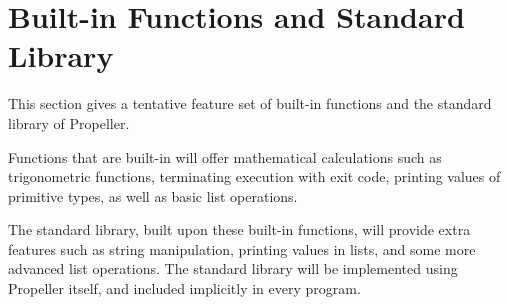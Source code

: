 \section{Built-in Functions and Standard Library}

This section gives a tentative feature set of built-in functions and the standard library of
Propeller.

Functions that are built-in will offer mathematical calculations such as trigonometric functions,
terminating execution with exit code, printing values of primitive types, as well as basic list
operations.

The standard library, built upon these built-in functions, will provide extra features such as
string manipulation, printing values in lists, and some more advanced list operations. The standard
library will be implemented using Propeller itself, and included implicitly in every program.
